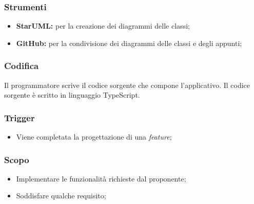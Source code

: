 \subsubsection*{Strumenti}
\begin{itemize}
	\item \textbf{StarUML:} per la creazione dei diagrammi delle classi;
	\item \textbf{GitHub\g:} per la condivisione dei diagrammi delle classi e degli appunti;
\end{itemize}





\subsubsection{Codifica}
\label{codifica}
Il programmatore scrive il codice sorgente che compone l'applicativo. 
Il codice sorgente è scritto in linguaggio TypeScript.

\subsubsection*{Trigger}
\begin{itemize}
	\item Viene completata la progettazione di una \textit{feature};
\end{itemize}

\subsubsection*{Scopo}
\begin{itemize}
	\item Implementare le funzionalità richieste dal proponente;
	\item Soddisfare qualche requisito;
\end{itemize}

